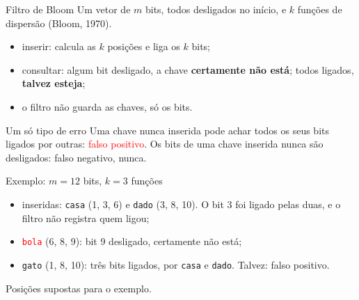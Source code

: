 \documentclass{beamer}
\newcommand{\tcr}[1]{\textcolor{red}{#1}}
\begin{document}
\begin{frame}{Filtro de Bloom}
	Um vetor de $m$ bits, todos desligados no início, e $k$ funções de dispersão
	(Bloom, 1970).

	\vspace{0.3cm}
	\begin{itemize}
		\item inserir: calcula as $k$ posições e liga os $k$ bits;
		\item consultar: algum bit desligado, a chave \textbf{certamente não está};
		      todos ligados, \textbf{talvez esteja};
		\item o filtro não guarda as chaves, só os bits.
	\end{itemize}

	\vspace{0.4cm}
	\begin{block}{Um só tipo de erro}
		Uma chave nunca inserida pode achar todos os seus bits ligados por outras:
		\tcr{falso positivo}. Os bits de uma chave inserida nunca são desligados:
		falso negativo, nunca.
	\end{block}
\end{frame}

\begin{frame}{Exemplo: $m = 12$ bits, $k = 3$ funções}
	\begin{center}
	\end{center}

	\vspace{0.1cm}
	\small
	\begin{itemize}
		\item inseridas: \texttt{casa} (1, 3, 6) e \texttt{dado} (3, 8, 10). O bit 3
		      foi ligado pelas duas, e o filtro não registra quem ligou;
		\item \tcr{\texttt{bola}} (6, 8, 9): bit 9 desligado, certamente não está;
		\item \textcolor{orange!80!black}{\texttt{gato}} (1, 8, 10): três bits
		      ligados, por \texttt{casa} e \texttt{dado}. Talvez: falso positivo.
	\end{itemize}

	\footnotesize Posições supostas para o exemplo.
\end{frame}
\end{document}
